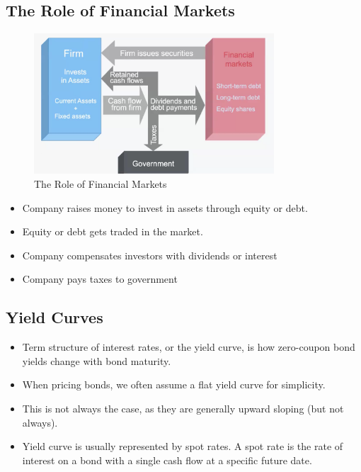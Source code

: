 \subsection*{The Role of Financial Markets}

\begin{figure}[H]
    \centering
    \includegraphics[width=0.8\textwidth]{img/2.2.png}
    \caption{The Role of Financial Markets}
\end{figure}

\begin{itemize}
    \item Company raises money to invest in assets through equity or debt.
    \item Equity or debt gets traded in the market.
    \item Company compensates investors with dividends or interest
    \item Company pays taxes to government
\end{itemize}

\subsection*{Yield Curves}
\begin{itemize}
    \item Term structure of interest rates, or the yield curve, is how zero-coupon bond yields change with bond maturity.
    \item When pricing bonds, we often assume a flat yield curve for simplicity. 
    \item This is not always the case, as they are generally upward sloping (but not always).
    \item Yield curve is usually represented by spot rates. A spot rate is the rate of interest on a bond with a single cash flow at a specific future date.
\end{itemize}

